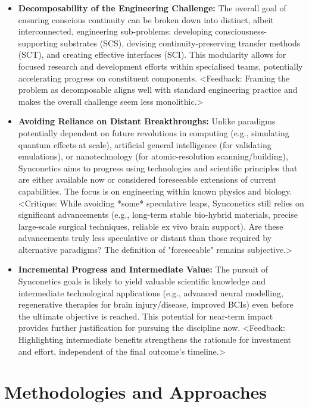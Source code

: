\documentclass[10pt]{article}
\begin{document}
\begin{sloppypar}
\begin{itemize}
    \item \textbf{Decomposability of the Engineering Challenge:} The overall goal of ensuring conscious continuity can be broken down into distinct, albeit interconnected, engineering sub-problems: developing consciousness-supporting substrates (SCS), devising continuity-preserving transfer methods (SCT), and creating effective interfaces (SCI). This modularity allows for focused research and development efforts within specialised teams, potentially accelerating progress on constituent components. <Feedback: Framing the problem as decomposable aligns well with standard engineering practice and makes the overall challenge seem less monolithic.>

    \item \textbf{Avoiding Reliance on Distant Breakthroughs:} Unlike paradigms potentially dependent on future revolutions in computing (e.g., simulating quantum effects at scale), artificial general intelligence (for validating emulations), or nanotechnology (for atomic-resolution scanning/building), Synconetics aims to progress using technologies and scientific principles that are either available now or considered foreseeable extensions of current capabilities. The focus is on engineering within known physics and biology. <Critique: While avoiding *some* speculative leaps, Synconetics still relies on significant advancements (e.g., long-term stable bio-hybrid materials, precise large-scale surgical techniques, reliable ex vivo brain support). Are these advancements truly less speculative or distant than those required by alternative paradigms? The definition of "foreseeable" remains subjective.>

    \item \textbf{Incremental Progress and Intermediate Value:} The pursuit of Synconetics goals is likely to yield valuable scientific knowledge and intermediate technological applications (e.g., advanced neural modelling, regenerative therapies for brain injury/disease, improved BCIs) even before the ultimate objective is reached. This potential for near-term impact provides further justification for pursuing the discipline now. <Feedback: Highlighting intermediate benefits strengthens the rationale for investment and effort, independent of the final outcome's timeline.>

  \end{itemize}

  \section{Methodologies and Approaches}
  \label{sec:methodologies}


\end{sloppypar}
\end{document}
